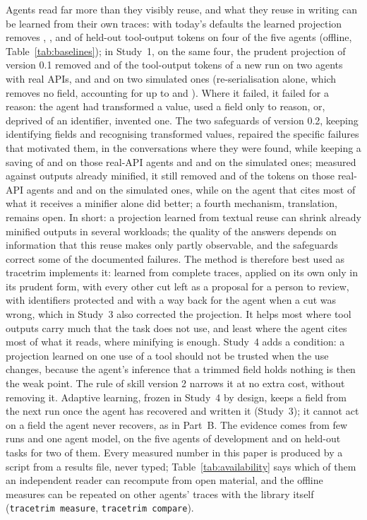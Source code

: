 Agents read far more than they visibly reuse, and what they reuse in writing can be learned from their own traces:
with today's defaults the learned projection removes \BaseLearnedRawi, \BaseLearnedRawiii, \BaseLearnedRawiv{} and
\BaseLearnedRawv{} of held-out tool-output tokens on four of the five agents (offline, Table~\ref{tab:baselines}); in
Study~1, on the same four, the prudent projection of version 0.1 removed \PhaseAPrudentSavingi{} and \PhaseAPrudentSavingiii{} of
the tool-output tokens of a new run on two agents with real APIs, and \PhaseAPrudentSavingiv{} and
\PhaseAPrudentSavingv{} on two simulated ones (re-serialisation alone, which removes no field, accounting for up to
\ReserialAi{} and \ReserialAiv{}). Where it failed, it failed for a reason: the agent had transformed a value, used a field only
to reason, or, deprived of an identifier, invented one. The two safeguards of version 0.2, keeping identifying fields and recognising
transformed values, repaired the specific failures that motivated them, in the conversations where they were found,
while keeping a saving of \StudyTwoVtwoTokensi{} and
\StudyTwoVtwoTokensiii{} on those real-API agents and \StudyTwoVtwoTokensiv{} and \StudyTwoVtwoTokensv{} on the
simulated ones; measured against outputs already minified, it still removed \VtwoVsMini{} and \VtwoVsMiniii{} of the
tokens on those real-API agents and \VtwoVsMiniv{} and \VtwoVsMinv{} on the simulated ones, while on the agent that
cites most of what it receives a minifier alone did better; a fourth mechanism, translation, remains open. In short: a projection learned from
textual reuse can shrink already minified outputs in several workloads; the quality of the answers depends on
information that this reuse makes only partly observable, and the safeguards correct some of the documented failures.
The method is therefore best used as tracetrim implements it: learned from complete traces, applied on its own only
in its prudent form, with every other cut left as a proposal for a person to review, with identifiers protected and
with a way back for the agent when a cut was wrong, which in Study~3 also corrected the projection. It helps most
where tool outputs carry much that the task does not use, and least where the agent cites most of what it reads,
where minifying is enough. Study~4 adds a condition: a projection learned on one use of a tool should not be
trusted when the use changes, because the agent's inference that a trimmed field holds nothing is then the weak
point. The rule of skill version 2 narrows it at no extra cost, without removing it. Adaptive learning, frozen in
Study~4 by design, keeps a field from the next run once the agent has recovered and written it (Study~3); it cannot
act on a field the agent never recovers, as in Part~B. The evidence comes from few runs and one agent model, on the
five agents of development and on held-out tasks for two of them. Every measured number in this paper is produced by
a script from a results file, never typed; Table~\ref{tab:availability} says which of them an independent reader can
recompute from open material, and the offline measures can be repeated on other agents' traces with the library
itself (\texttt{tracetrim measure}, \texttt{tracetrim compare}).

